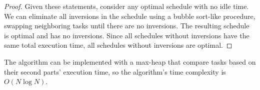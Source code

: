 \documentclass{article}
\begin{document}
\begin{enumerate}
\begin{proof}
    Given these statements, consider any optimal schedule with no idle time. We can eliminate all inversions in the schedule using a bubble sort-like procedure, swapping neighboring tasks until there are no inversions. The resulting schedule is optimal and has no inversions. Since all schedules without inversions have the same total execution time, all schedules without inversions are optimal.
\end{proof}

The algorithm can be implemented with a max-heap that compare tasks based on their second parts' execution time, so the algorithm's time complexity is $O(N\log N)$.

\end{enumerate}
\end{document}
